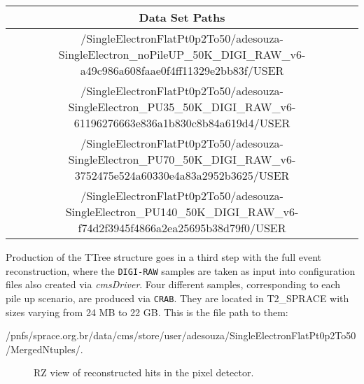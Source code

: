 \documentclass[a4paper,12pt,oneside]{article}
\begin{document}
\begin{table}[!htb]
\begin{tabular}{c}
{\bf Data Set Paths} \\ \hline \hline
/SingleElectronFlatPt0p2To50/adesouza-SingleElectron\_noPileUP\_50K\_DIGI\_RAW\_v6-a49c986a608faae0f4ff11329e2bb83f/USER                         \\
/SingleElectronFlatPt0p2To50/adesouza-SingleElectron\_PU35\_50K\_DIGI\_RAW\_v6-61196276663e836a1b830c8b84a619d4/USER                         \\
/SingleElectronFlatPt0p2To50/adesouza-SingleElectron\_PU70\_50K\_DIGI\_RAW\_v6-3752475e524a60330e4a83a2952b3625/USER                         \\
/SingleElectronFlatPt0p2To50/adesouza-SingleElectron\_PU140\_50K\_DIGI\_RAW\_v6-f74d2f3945f4866a2ea25695b38d79f0/USER                         \\ \hline
                     \end{tabular}
                   \end{table}

                   Production of the TTree structure goes in a third step with the full event reconstruction, where the
                   \texttt{DIGI-RAW} samples are taken as input into configuration files also created via {\it cmsDriver}.
                   Four different samples, corresponding to each pile up scenario, are produced via \texttt{CRAB}. They are
                   located in T2\_SPRACE with sizes varying from 24 MB to 22 GB. This is the file path to them:

                   {\footnotesize /pnfs/sprace.org.br/data/cms/store/user/adesouza/SingleElectronFlatPt0p2To50/MergedNtuples/}.

                   
                   \begin{figure}[!htb]
                     \centering
                     \caption{RZ view of reconstructed hits in the pixel detector.}
                     \label{}
                   \end{figure}
                   
\end{document}
